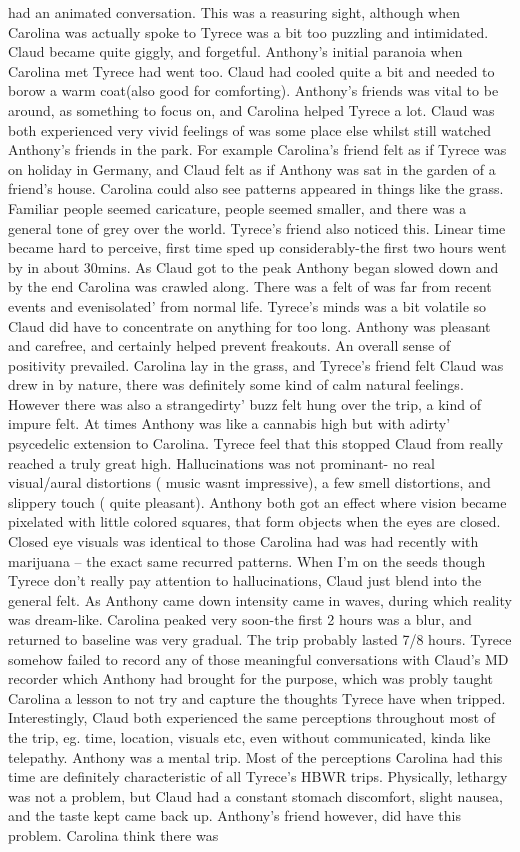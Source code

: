 \documentclass[12pt]{book}
\begin{document}
had an animated conversation. This was a reasuring sight, although when Carolina was actually spoke to Tyrece was a bit too puzzling and intimidated. Claud became quite giggly, and forgetful. Anthony's initial paranoia when Carolina met Tyrece had went too. Claud had cooled quite a bit and needed to borow a warm coat(also good for comforting). Anthony's friends was vital to be around, as something to focus on, and Carolina helped Tyrece a lot. Claud was both experienced very vivid feelings of was some place else whilst still watched Anthony's friends in the park. For example Carolina's friend felt as if Tyrece was on holiday in Germany, and Claud felt as if Anthony was sat in the garden of a friend's house. Carolina could also see patterns appeared in things like the grass. Familiar people seemed caricature, people seemed smaller, and there was a general tone of grey over the world. Tyrece's friend also noticed this. Linear time became hard to perceive, first time sped up considerably-the first two hours went by in about 30mins. As Claud got to the peak Anthony began slowed down and by the end Carolina was crawled along. There was a felt of was far from recent events and evenisolated' from normal life. Tyrece's minds was a bit volatile so Claud did have to concentrate on anything for too long. Anthony was pleasant and carefree, and certainly helped prevent freakouts. An overall sense of positivity prevailed. Carolina lay in the grass, and Tyrece's friend felt Claud was drew in by nature, there was definitely some kind of calm natural feelings. However there was also a strangedirty' buzz felt hung over the trip, a kind of impure felt. At times Anthony was like a cannabis high but with adirty' psycedelic extension to Carolina. Tyrece feel that this stopped Claud from really reached a truly great high. Hallucinations was not prominant- no real visual/aural distortions ( music wasnt impressive), a few smell distortions, and slippery touch ( quite pleasant). Anthony both got an effect where vision became pixelated with little colored squares, that form objects when the eyes are closed. Closed eye visuals was identical to those Carolina had was had recently with marijuana -- the exact same recurred patterns. When I'm on the seeds though Tyrece don't really pay attention to hallucinations, Claud just blend into the general felt. As Anthony came down intensity came in waves, during which reality was dream-like. Carolina peaked very soon-the first 2 hours was a blur, and returned to baseline was very gradual. The trip probably lasted 7/8 hours. Tyrece somehow failed to record any of those meaningful conversations with Claud's MD recorder which Anthony had brought for the purpose, which was probly taught Carolina a lesson to not try and capture the thoughts Tyrece have when tripped. Interestingly, Claud both experienced the same perceptions throughout most of the trip, eg. time, location, visuals etc, even without communicated, kinda like telepathy. Anthony was a mental trip. Most of the perceptions Carolina had this time are definitely characteristic of all Tyrece's HBWR trips. Physically, lethargy was not a problem, but Claud had a constant stomach discomfort, slight nausea, and the taste kept came back up. Anthony's friend however, did have this problem. Carolina think there was 
\end{document}
